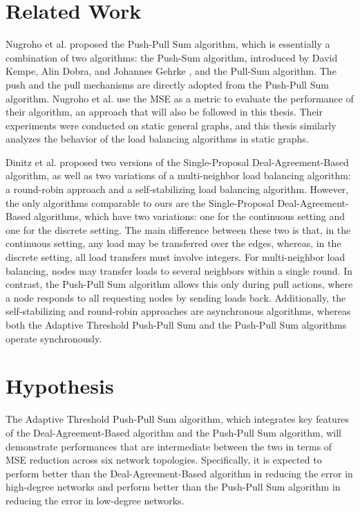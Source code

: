 \section{Related Work}\label{sec:relatedwork}
Nugroho et al. \cite{nugroho2023PushPullSumDataAg} proposed the Push-Pull Sum algorithm, which is essentially a combination of two algorithms: the Push-Sum algorithm, introduced by David Kempe, Alin Dobra, and Johannes Gehrke \cite{kempe2003gossipbasedComp}, and the Pull-Sum algorithm. The push and the pull mechanisms are directly adopted from the Push-Pull Sum algorithm. Nugroho et al. use the MSE as a metric to evaluate the performance of their algorithm, an approach that will also be followed in this thesis. Their experiments were conducted on static general graphs, and this thesis similarly analyzes the behavior of the load balancing algorithms in static graphs.

Dinitz et al. \cite{Dinitz2023DAB} proposed two versions of the Single-Proposal Deal-Agreement-Based algorithm, as well as two variations of a multi-neighbor load balancing algorithm: a round-robin approach and a self-stabilizing load balancing algorithm. However, the only algorithms comparable to ours are the Single-Proposal Deal-Agreement-Based algorithms, which have two variations: one for the continuous setting and one for the discrete setting. The main difference between these two is that, in the continuous setting, any load may be transferred over the edges, whereas, in the discrete setting, all load transfers must involve integers. For multi-neighbor load balancing, nodes may transfer loads to several neighbors within a single round. In contrast, the Push-Pull Sum algorithm allows this only during pull actions, where a node responds to all requesting nodes by sending loads back. Additionally, the self-stabilizing and round-robin approaches are asynchronous algorithms, whereas both the Adaptive Threshold Push-Pull Sum and the Push-Pull Sum algorithms operate synchronously.

\section{Hypothesis}\label{sec:hypothesis}
The Adaptive Threshold Push-Pull Sum algorithm, which integrates key features of the Deal-Agreement-Based algorithm and the Push-Pull Sum algorithm, will demonstrate performances that are intermediate between the two in terms of MSE reduction across six network topologies. Specifically, it is expected to perform better than the Deal-Agreement-Based algorithm in reducing the error in high-degree networks and perform better than the Push-Pull Sum algorithm in reducing the error in low-degree networks.

